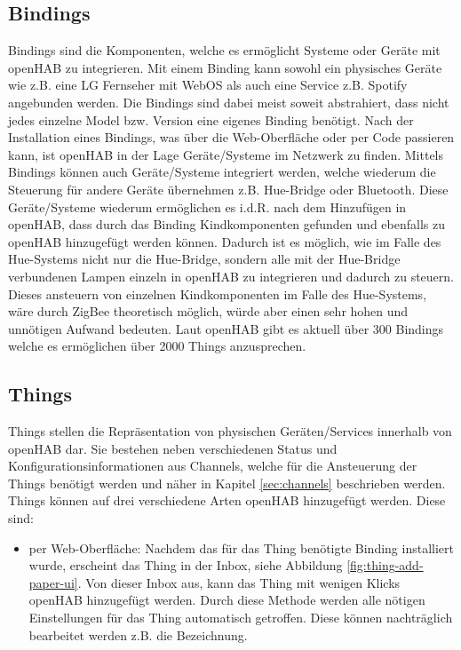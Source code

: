 \subsection{Bindings} \label{sec:Bindings}
Bindings sind die Komponenten, welche es ermöglicht Systeme oder Geräte mit openHAB zu integrieren. Mit einem Binding kann sowohl ein physisches Geräte wie z.B. eine LG Fernseher mit WebOS als auch eine Service z.B. Spotify angebunden werden. Die Bindings sind dabei meist soweit abstrahiert, dass nicht jedes einzelne Model bzw. Version eine eigenes Binding benötigt.
Nach der Installation eines Bindings, was über die Web-Oberfläche oder per Code passieren kann, ist openHAB in der Lage Geräte/Systeme im Netzwerk zu finden. Mittels Bindings können auch Geräte/Systeme integriert werden, welche wiederum die Steuerung für andere Geräte übernehmen z.B. Hue-Bridge oder Bluetooth. Diese Geräte/Systeme wiederum ermöglichen es i.d.R. nach dem Hinzufügen in openHAB, dass durch das Binding Kindkomponenten gefunden und ebenfalls zu openHAB hinzugefügt werden können. Dadurch ist es möglich, wie im Falle des Hue-Systems nicht nur die Hue-Bridge, sondern alle mit der Hue-Bridge verbundenen Lampen einzeln in openHAB zu integrieren und dadurch zu steuern. Dieses ansteuern von einzelnen Kindkomponenten im Falle des Hue-Systems, wäre durch ZigBee theoretisch möglich, würde aber einen sehr hohen und unnötigen Aufwand bedeuten. 
Laut openHAB gibt es aktuell über 300 Bindings welche es ermöglichen über 2000 Things anzusprechen.

\subsection{Things}
Things stellen die Repräsentation von physischen Geräten/Services innerhalb von openHAB dar. Sie bestehen neben verschiedenen Status und Konfigurationsinformationen aus Channels, welche für die Ansteuerung der Things benötigt werden und näher in Kapitel \ref{sec:channels} beschrieben werden.
Things können auf drei verschiedene Arten openHAB hinzugefügt werden. Diese sind:
\begin{itemize}
	\item per Web-Oberfläche: Nachdem das für das Thing benötigte Binding installiert wurde, erscheint das Thing in der Inbox, siehe Abbildung \ref{fig:thing-add-paper-ui}. Von dieser Inbox aus, kann das Thing mit wenigen Klicks openHAB hinzugefügt werden. Durch diese Methode werden alle nötigen Einstellungen für das Thing automatisch getroffen. Diese können nachträglich bearbeitet werden z.B. die Bezeichnung. 
\end{itemize}

